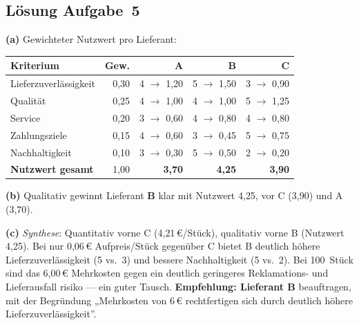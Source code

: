 \documentclass[11pt, a4paper]{article}
\begin{document}
\subsection*{Lösung Aufgabe~5}
\begin{loesung}
\textbf{(a)} Gewichteter Nutzwert pro Lieferant:

\begin{center}
\begin{tabular}{lrrrr}
\toprule
\textbf{Kriterium} & \textbf{Gew.} & \textbf{A} & \textbf{B} & \textbf{C}\\
\midrule
Lieferzuverlässigkeit & 0{,}30 & 4 $\to$ 1{,}20 & 5 $\to$ 1{,}50 & 3 $\to$ 0{,}90\\
Qualität & 0{,}25 & 4 $\to$ 1{,}00 & 4 $\to$ 1{,}00 & 5 $\to$ 1{,}25\\
Service & 0{,}20 & 3 $\to$ 0{,}60 & 4 $\to$ 0{,}80 & 4 $\to$ 0{,}80\\
Zahlungsziele & 0{,}15 & 4 $\to$ 0{,}60 & 3 $\to$ 0{,}45 & 5 $\to$ 0{,}75\\
Nachhaltigkeit & 0{,}10 & 3 $\to$ 0{,}30 & 5 $\to$ 0{,}50 & 2 $\to$ 0{,}20\\
\midrule
\textbf{Nutzwert gesamt} & 1{,}00 & \textbf{3{,}70} & \textbf{4{,}25} & \textbf{3{,}90}\\
\bottomrule
\end{tabular}
\end{center}

\textbf{(b)} Qualitativ gewinnt Lieferant \textbf{B} klar mit Nutzwert 4{,}25, vor C (3{,}90)
und A (3{,}70).

\textbf{(c)} \emph{Synthese}: Quantitativ vorne C (4{,}21\,€/Stück), qualitativ vorne B
(Nutzwert 4{,}25). Bei nur 0{,}06\,€ Aufpreis/Stück gegenüber C bietet B deutlich höhere
Lieferzuverlässigkeit (5 vs.\ 3) und bessere Nachhaltigkeit (5 vs.\ 2). Bei 100~Stück
sind das 6,00\,€ Mehrkosten gegen ein deutlich geringeres Reklamations- und Lieferausfall­
risiko --- ein guter Tausch. \textbf{Empfehlung: Lieferant B} beauftragen, mit der Begründung
„Mehrkosten von 6\,€ rechtfertigen sich durch deutlich höhere Lieferzuverlässigkeit''.
\end{loesung}
\end{document}
